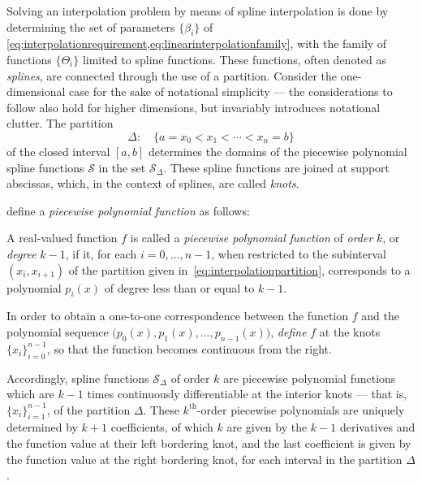 Solving an interpolation problem by means of spline interpolation is done
by determining the set of parameters $\{\beta_{i}\}$ of
\cref{eq:interpolationrequirement,eq:linearinterpolationfamily}, with the
family of functions $\{\Theta_{i}\}$ limited to spline functions. These
functions, often denoted as \emph{splines}, are connected through the use
of a partition. Consider the one-dimensional case for the sake of notational
simplicity --- the considerations to follow also hold for higher dimensions,
but invariably introduces notational clutter. The partition
\begin{equation}
    \label{eq:interpolationpartition}
    \Delta : \quad \{a = x_{0} < x_{1} < \cdots < x_{n} = b\}
\end{equation}
of the closed interval $[a,b]$ determines the domains of the piecewise
polynomial spline functions $\mathcal{S}$ in the set $\mathcal{S}_{\Delta}$.
These spline functions are joined at support abscissas, which, in the context
of splines, are called \emph{knots}.

\textcite[p.107]{stoer2002introduction} define a
\emph{piecewise polynomial function} as follows:
\begin{defn}
    \label{def:piecewise_polynomial}
    A real-valued function $f$ is called a \emph{piecewise polynomial function}
    of \emph{order} $k$, or \emph{degree} $k-1$, if it, for each
    $i=0,\ldots,n-1$, when restricted to the subinterval $(x_{i},x_{i+1})$ of
    the partition given in~\cref{eq:interpolationpartition}, corresponds to a
    polynomial $p_{i}(x)$ of degree less than or equal to $k-1$.

    \vspace{-0.8\baselineskip}
    In order to obtain a one-to-one correspondence between the function $f$ and
    the polynomial sequence $\big(p_{0}(x),p_{1}(x),\ldots,p_{n-1}(x)\big)$,
    \emph{define} $f$ at the knots $\{x_{i}\}_{i=0}^{n-1}$, so that the
    function becomes continuous from the right.
\end{defn}

Accordingly, spline functions $\mathcal{S}_{\Delta}$ of order $k$ are piecewise
polynomial functions which are $k-1$ times continuously differentiable at the
interior knots --- that is, $\{x_{i}\}_{i=1}^{n-1}$, of the partition $\Delta$.
These $k^{\text{th}}$-order piecewise polynomials are uniquely determined by
$k+1$ coefficients, of which $k$ are given by the $k-1$ derivatives and the
function value at their left bordering knot, and the last coefficient is given
by the function value at the right bordering knot, for each interval in the
partition $\Delta$ \parencite[pp.107--108]{stoer2002introduction}.

